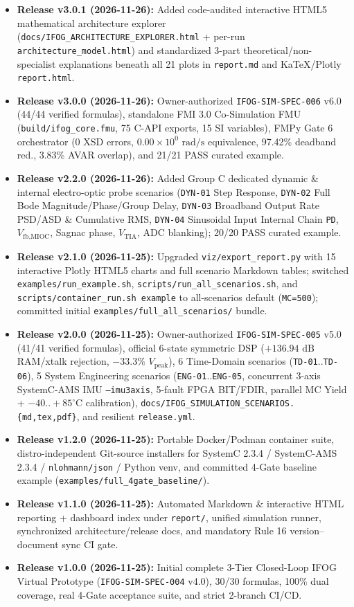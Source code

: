 \documentclass[11pt,a4paper]{article}
\begin{document}
\begin{itemize}
    \item \textbf{Release v3.0.1 (2026-11-26):} Added code-audited interactive HTML5 mathematical architecture explorer (\texttt{docs/IFOG\_ARCHITECTURE\_EXPLORER.html} + per-run \texttt{architecture\_model.html}) and standardized 3-part theoretical/non-specialist explanations beneath all 21 plots in \texttt{report.md} and KaTeX/Plotly \texttt{report.html}.
    \item \textbf{Release v3.0.0 (2026-11-26):} Owner-authorized \texttt{IFOG-SIM-SPEC-006} v6.0 (44/44 verified formulas), standalone FMI 3.0 Co-Simulation FMU (\texttt{build/ifog\_core.fmu}, 75 C-API exports, 15 SI variables), FMPy Gate 6 orchestrator (0 XSD errors, $0.00\times 10^0\text{ rad/s}$ equivalence, 97.42\% deadband red., 3.83\% AVAR overlap), and 21/21 PASS curated example.
    \item \textbf{Release v2.2.0 (2026-11-26):} Added Group C dedicated dynamic \& internal electro-optic probe scenarios (\texttt{DYN-01} Step Response, \texttt{DYN-02} Full Bode Magnitude/Phase/Group Delay, \texttt{DYN-03} Broadband Output Rate PSD/ASD \& Cumulative RMS, \texttt{DYN-04} Sinusoidal Input Internal Chain \texttt{PD}, $V_{\text{fb,MIOC}}$, Sagnac phase, $V_{\text{TIA}}$, ADC blanking); 20/20 PASS curated example.
    \item \textbf{Release v2.1.0 (2026-11-25):} Upgraded \texttt{viz/export\_report.py} with 15 interactive Plotly HTML5 charts and full scenario Markdown tables; switched \texttt{examples/run\_example.sh}, \texttt{scripts/run\_all\_scenarios.sh}, and \texttt{scripts/container\_run.sh example} to all-scenarios default (\texttt{MC=500}); committed initial \texttt{examples/full\_all\_scenarios/} bundle.
    \item \textbf{Release v2.0.0 (2026-11-25):} Owner-authorized \texttt{IFOG-SIM-SPEC-005} v5.0 (41/41 verified formulas), official 6-state symmetric DSP ($+136.94\text{ dB}$ RAM/xtalk rejection, $-33.3\%$ $V_{\text{peak}}$), 6 Time-Domain scenarios (\texttt{TD-01}..\texttt{TD-06}), 5 System Engineering scenarios (\texttt{ENG-01}..\texttt{ENG-05}, concurrent 3-axis SystemC-AMS IMU \texttt{--imu3axis}, 5-fault FPGA BIT/FDIR, parallel MC Yield + $-40..+85^\circ\text{C}$ calibration), \texttt{docs/IFOG\_SIMULATION\_SCENARIOS.\{md,tex,pdf\}}, and resilient \texttt{release.yml}.
    \item \textbf{Release v1.2.0 (2026-11-25):} Portable Docker/Podman container suite, distro-independent Git-source installers for SystemC 2.3.4 / SystemC-AMS 2.3.4 / \texttt{nlohmann/json} / Python venv, and committed 4-Gate baseline example (\texttt{examples/full\_4gate\_baseline/}).
    \item \textbf{Release v1.1.0 (2026-11-25):} Automated Markdown \& interactive HTML reporting + dashboard index under \texttt{report/}, unified simulation runner, synchronized architecture/release docs, and mandatory Rule 16 version--document sync CI gate.
    \item \textbf{Release v1.0.0 (2026-11-25):} Initial complete 3-Tier Closed-Loop IFOG Virtual Prototype (\texttt{IFOG-SIM-SPEC-004} v4.0), 30/30 formulas, 100\% dual coverage, real 4-Gate acceptance suite, and strict 2-branch CI/CD.
\end{itemize}
\end{document}
